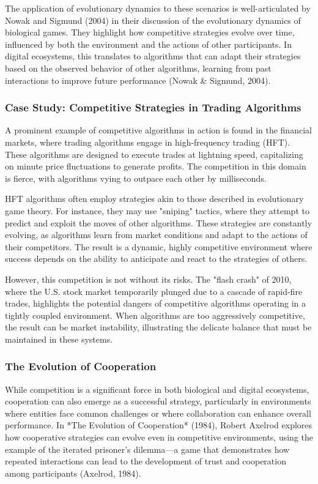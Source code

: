 \documentclass[12pt,twoside]{article}
\begin{document}
The application of evolutionary dynamics to these scenarios is well-articulated by Nowak and Sigmund (2004) in their discussion of the evolutionary dynamics of biological games. They highlight how competitive strategies evolve over time, influenced by both the environment and the actions of other participants. In digital ecosystems, this translates to algorithms that can adapt their strategies based on the observed behavior of other algorithms, learning from past interactions to improve future performance (Nowak & Sigmund, 2004).

\subsubsection{Case Study: Competitive Strategies in Trading Algorithms}

A prominent example of competitive algorithms in action is found in the financial markets, where trading algorithms engage in high-frequency trading (HFT). These algorithms are designed to execute trades at lightning speed, capitalizing on minute price fluctuations to generate profits. The competition in this domain is fierce, with algorithms vying to outpace each other by milliseconds.

HFT algorithms often employ strategies akin to those described in evolutionary game theory. For instance, they may use "sniping" tactics, where they attempt to predict and exploit the moves of other algorithms. These strategies are constantly evolving, as algorithms learn from market conditions and adapt to the actions of their competitors. The result is a dynamic, highly competitive environment where success depends on the ability to anticipate and react to the strategies of others.

However, this competition is not without its risks. The "flash crash" of 2010, where the U.S. stock market temporarily plunged due to a cascade of rapid-fire trades, highlights the potential dangers of competitive algorithms operating in a tightly coupled environment. When algorithms are too aggressively competitive, the result can be market instability, illustrating the delicate balance that must be maintained in these systems.

\subsubsection{The Evolution of Cooperation}

While competition is a significant force in both biological and digital ecosystems, cooperation can also emerge as a successful strategy, particularly in environments where entities face common challenges or where collaboration can enhance overall performance. In *The Evolution of Cooperation* (1984), Robert Axelrod explores how cooperative strategies can evolve even in competitive environments, using the example of the iterated prisoner’s dilemma—a game that demonstrates how repeated interactions can lead to the development of trust and cooperation among participants (Axelrod, 1984).
\end{document}
